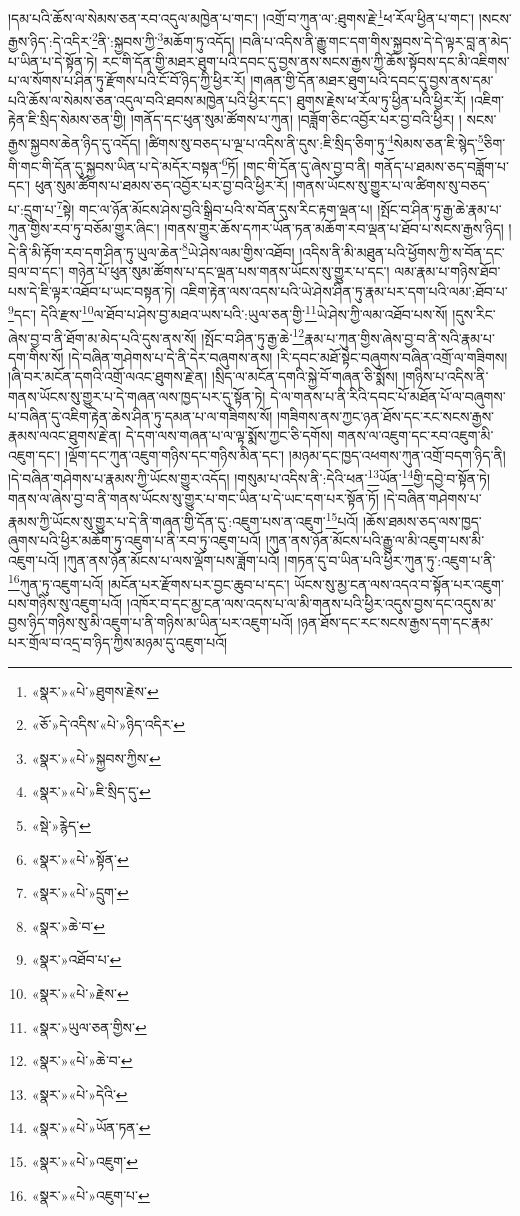 །དམ་པའི་ཆོས་ལ་སེམས་ཅན་རབ་འདུལ་མཁྱེན་པ་གང་། །འགྲོ་བ་ཀུན་ལ་:ཐུགས་རྗེ་\footnote{«སྣར་»«པེ་»ཐུགས་རྗེས་}ཕ་རོལ་ཕྱིན་པ་གང་། །སངས་རྒྱས་ཉིད་:དེ་འདིར་\footnote{«ཅོ་»དེ་འདིས་«པེ་»ཉིད་འདིར་}ནི་:སྐྱབས་ཀྱི་\footnote{«སྣར་»«པེ་»སྐྱབས་ཀྱིས་}མཆོག་ཏུ་འདོད། །བཞི་པ་འདིས་ནི་རྒྱུ་གང་དག་གིས་སྐྱབས་དེ་དེ་ལྟར་བླ་ན་མེད་པ་ཡིན་པ་དེ་སྟོན་ཏེ། རང་གི་དོན་གྱི་མཐར་ཐུག་པའི་དབང་དུ་བྱས་ནས་སངས་རྒྱས་ཀྱི་ཆོས་སྟོབས་དང་མི་འཇིགས་པ་ལ་སོགས་པ་ཤིན་ཏུ་རྫོགས་པའི་ངོ་བོ་ཉིད་ཀྱི་ཕྱིར་རོ། །གཞན་གྱི་དོན་མཐར་ཐུག་པའི་དབང་དུ་བྱས་ནས་དམ་པའི་ཆོས་ལ་སེམས་ཅན་འདུལ་བའི་ཐབས་མཁྱེན་པའི་ཕྱིར་དང་། ཐུགས་རྗེས་ཕ་རོལ་ཏུ་ཕྱིན་པའི་ཕྱིར་རོ། །འཇིག་རྟེན་ཇི་སྲིད་སེམས་ཅན་གྱི། །གནོད་དང་ཕུན་སུམ་ཚོགས་པ་ཀུན། །བཟློག་ཅིང་འབྱོར་པར་བྱ་བའི་ཕྱིར། །
སངས་རྒྱས་སྐྱབས་ཆེན་ཉིད་དུ་འདོད། །ཚིགས་སུ་བཅད་པ་ལྔ་པ་འདིས་ནི་དུས་:ཇི་སྲིད་ཅིག་ཏུ་\footnote{«སྣར་»«པེ་»ཇི་སྲིད་དུ་}སེམས་ཅན་ཇི་སྙེད་\footnote{«སྡེ་»རྙེད་}ཅིག་གི་གང་གི་དོན་དུ་སྐྱབས་ཡིན་པ་དེ་མདོར་བསྟན་\footnote{«སྣར་»«པེ་»སྟོན་}ཏོ། །གང་གི་དོན་དུ་ཞེས་བྱ་བ་ནི། གནོད་པ་ཐམས་ཅད་བཟློག་པ་དང་། ཕུན་སུམ་ཚོགས་པ་ཐམས་ཅད་འབྱོར་པར་བྱ་བའི་ཕྱིར་རོ། །གནས་ཡོངས་སུ་གྱུར་པ་ལ་ཚིགས་སུ་བཅད་པ་:དྲུག་པ་\footnote{«སྣར་»«པེ་»དྲུག་}སྟེ། གང་ལ་ཉོན་མོངས་ཤེས་བྱའི་སྒྲིབ་པའི་ས་བོན་དུས་རིང་རྟག་ལྡན་པ། །སྤོང་བ་ཤིན་ཏུ་རྒྱ་ཆེ་རྣམ་པ་ཀུན་གྱིས་རབ་ཏུ་བཅོམ་གྱུར་ཞིང་། །གནས་གྱུར་ཆོས་དཀར་ཡོན་ཏན་མཆོག་རབ་ལྡན་པ་ཐོབ་པ་སངས་རྒྱས་ཉིད། །དེ་ནི་མི་རྟོག་རབ་དག་ཤིན་ཏུ་ཡུལ་ཆེན་\footnote{«སྣར་»ཆེ་བ་}ཡེ་ཤེས་ལམ་གྱིས་འཐོབ། །འདིས་ནི་མི་མཐུན་པའི་ཕྱོགས་ཀྱི་ས་བོན་དང་བྲལ་བ་དང་། གཉེན་པོ་ཕུན་སུམ་ཚོགས་པ་དང་ལྡན་པས་གནས་ཡོངས་སུ་གྱུར་པ་དང་། ལམ་རྣམ་པ་གཉིས་ཐོབ་པས་དེ་ཇི་ལྟར་འཐོབ་པ་ཡང་བསྟན་ཏེ། འཇིག་རྟེན་ལས་འདས་པའི་ཡེ་ཤེས་ཤིན་ཏུ་རྣམ་པར་དག་པའི་ལམ་:ཐོབ་པ་\footnote{«སྣར་»འཐོབ་པ་}དང་། དེའི་རྫས་\footnote{«སྣར་»«པེ་»རྗེས་}ལ་ཐོབ་པ་ཤེས་བྱ་མཐའ་ཡས་པའི་:ཡུལ་ཅན་གྱི་\footnote{«སྣར་»ཡུལ་ཅན་གྱིས་}ཡེ་ཤེས་ཀྱི་ལམ་འཐོབ་པས་སོ། །དུས་རིང་ཞེས་བྱ་བ་ནི་ཐོག་མ་མེད་པའི་དུས་ནས་སོ། །སྤོང་བ་ཤིན་ཏུ་རྒྱ་ཆེ་\footnote{«སྣར་»«པེ་»ཆེ་བ་}རྣམ་པ་ཀུན་གྱིས་ཞེས་བྱ་བ་ནི་སའི་རྣམ་པ་དག་གིས་སོ། །དེ་བཞིན་གཤེགས་པ་དེ་ནི་དེར་བཞུགས་ནས། །རི་དབང་མཐོ་སྟེང་བཞུགས་བཞིན་འགྲོ་ལ་གཟིགས། །ཞི་བར་མངོན་དགའི་འགྲོ་ལའང་ཐུགས་རྗེ་ན། །སྲིད་ལ་མངོན་དགའི་སྐྱེ་བོ་གཞན་ཅི་སྨོས། །གཉིས་པ་འདིས་ནི་གནས་ཡོངས་སུ་གྱུར་པ་དེ་གཞན་ལས་ཁྱད་པར་དུ་སྟོན་ཏེ། དེ་ལ་གནས་པ་ནི་རིའི་དབང་པོ་མཐོན་པོ་ལ་བཞུགས་པ་བཞིན་དུ་འཇིག་རྟེན་ཆེས་ཤིན་ཏུ་དམན་པ་ལ་གཟིགས་སོ། །གཟིགས་ནས་ཀྱང་ཉན་ཐོས་དང་རང་སངས་རྒྱས་རྣམས་ལའང་ཐུགས་རྗེ་ན། དེ་དག་ལས་གཞན་པ་ལ་ལྟ་སྨོས་ཀྱང་ཅི་དགོས། གནས་ལ་འཇུག་དང་རབ་འཇུག་མི་འཇུག་དང་། །ལྡོག་དང་ཀུན་འཇུག་གཉིས་དང་གཉིས་མིན་དང་། །མཉམ་དང་ཁྱད་འཕགས་ཀུན་འགྲོ་བདག་ཉིད་ནི། །དེ་བཞིན་གཤེགས་པ་རྣམས་ཀྱི་ཡོངས་གྱུར་འདོད། །གསུམ་པ་འདིས་ནི་:དེའི་ཕན་\footnote{«སྣར་»«པེ་»དེའི་}ཡོན་\footnote{«སྣར་»«པེ་»ཡོན་ཏན་}གྱི་དབྱེ་བ་སྟོན་ཏེ། གནས་ལ་ཞེས་བྱ་བ་ནི་གནས་ཡོངས་སུ་གྱུར་པ་གང་ཡིན་པ་དེ་ཡང་དག་པར་སྟོན་ཏོ། །དེ་བཞིན་གཤེགས་པ་རྣམས་ཀྱི་ཡོངས་སུ་གྱུར་པ་དེ་ནི་གཞན་གྱི་དོན་དུ་:འཇུག་པས་ན་འཇུག་\footnote{«སྣར་»«པེ་»འཇུག་}པའོ། །ཆོས་ཐམས་ཅད་ལས་ཁྱད་ཞུགས་པའི་ཕྱིར་མཆོག་ཏུ་འཇུག་པ་ནི་རབ་ཏུ་འཇུག་པའོ། །ཀུན་ནས་ཉོན་མོངས་པའི་རྒྱུ་ལ་མི་འཇུག་པས་མི་འཇུག་པའོ། །ཀུན་ནས་ཉོན་མོངས་པ་ལས་ལྡོག་པས་ཟློག་པའོ། །གཏན་དུ་བ་ཡིན་པའི་ཕྱིར་ཀུན་ཏུ་:འཇུག་པ་ནི་\footnote{«སྣར་»«པེ་»འཇུག་པ་}ཀུན་ཏུ་འཇུག་པའོ། །མངོན་པར་རྫོགས་པར་བྱང་ཆུབ་པ་དང་། ཡོངས་སུ་མྱ་ངན་ལས་འདའ་བ་སྟོན་པར་འཇུག་པས་གཉིས་སུ་འཇུག་པའོ། །འཁོར་བ་དང་མྱ་ངན་ལས་འདས་པ་ལ་མི་གནས་པའི་ཕྱིར་འདུས་བྱས་དང་འདུས་མ་བྱས་ཉིད་གཉིས་སུ་མི་འཇུག་པ་ནི་གཉིས་མ་ཡིན་པར་འཇུག་པའོ། །ཉན་ཐོས་དང་རང་སངས་རྒྱས་དག་དང་རྣམ་པར་གྲོལ་བ་འདྲ་བ་ཉིད་ཀྱིས་མཉམ་དུ་འཇུག་པའོ། 